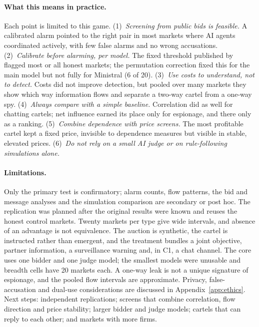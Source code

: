 \paragraph{What this means in practice.}
Each point is limited to this game.
(1)~\emph{Screening from public bids is feasible.} A calibrated alarm
pointed to the right pair in most markets where AI agents coordinated
actively, with few false alarms and no wrong accusations.
(2)~\emph{Calibrate before alarming, per model.} The fixed threshold
published by \citet{bonjour2022} flagged most or all honest markets; the
permutation correction fixed this for the main model but not fully for
Ministral (6 of 20).
(3)~\emph{Use costs to understand, not to detect.} Costs did not improve
detection, but pooled over many markets they show which way information
flows and separate a two-way cartel from a one-way spy.
(4)~\emph{Always compare with a simple baseline.} Correlation did as well
for chatting cartels; net influence earned its place only for espionage,
and there only as a ranking.
(5)~\emph{Combine dependence with price screens.} The most profitable
cartel kept a fixed price, invisible to dependence measures but visible in
stable, elevated prices. (6)~\emph{Do not rely on a small AI judge or on
rule-following simulations alone.}

\paragraph{Limitations.}
Only the primary test is confirmatory; alarm counts, flow patterns, the
bid and message analyses and the simulation comparison are secondary or
post hoc. The replication was planned after the original results were known
and reuses the honest control markets. Twenty markets per type give wide
intervals, and absence of an advantage is not equivalence. The auction is
synthetic, the cartel is instructed rather than emergent, and the treatment
bundles a joint objective, partner information, a surveillance warning and,
in C1, a chat channel. The core uses one bidder and one judge model; the
smallest models were unusable and breadth cells have 20 markets each. A
one-way leak is not a unique signature of espionage, and the pooled flow
intervals are approximate. Privacy, false-accusation and dual-use
considerations are discussed in Appendix~\ref{app:ethics}. Next steps: independent
replications; screens that combine correlation, flow direction and price
stability; larger bidder and judge models; cartels that can reply to each other; and
markets with more firms.
